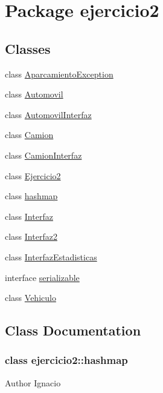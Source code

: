 \hypertarget{namespaceejercicio2}{}\section{Package ejercicio2}
\label{namespaceejercicio2}
\subsection*{Classes}
\begin{DoxyCompactItemize}
\item 
class \mbox{\hyperlink{classejercicio2_1_1_aparcamiento_exception}{Aparcamiento\+Exception}}
\item 
class \mbox{\hyperlink{classejercicio2_1_1_automovil}{Automovil}}
\item 
class \mbox{\hyperlink{classejercicio2_1_1_automovil_interfaz}{Automovil\+Interfaz}}
\item 
class \mbox{\hyperlink{classejercicio2_1_1_camion}{Camion}}
\item 
class \mbox{\hyperlink{classejercicio2_1_1_camion_interfaz}{Camion\+Interfaz}}
\item 
class \mbox{\hyperlink{classejercicio2_1_1_ejercicio2}{Ejercicio2}}
\item 
class \mbox{\hyperlink{namespaceejercicio2_classejercicio2_1_1hashmap}{hashmap}}
\item 
class \mbox{\hyperlink{classejercicio2_1_1_interfaz}{Interfaz}}
\item 
class \mbox{\hyperlink{classejercicio2_1_1_interfaz2}{Interfaz2}}
\item 
class \mbox{\hyperlink{classejercicio2_1_1_interfaz_estadisticas}{Interfaz\+Estadisticas}}
\item 
interface \mbox{\hyperlink{interfaceejercicio2_1_1serializable}{serializable}}
\item 
class \mbox{\hyperlink{classejercicio2_1_1_vehiculo}{Vehiculo}}
\end{DoxyCompactItemize}


\subsection{Class Documentation}
\label{classejercicio2_1_1hashmap}
\subsubsection{class ejercicio2\+:\+:hashmap}
\begin{DoxyAuthor}{Author}
Ignacio 
\end{DoxyAuthor}
